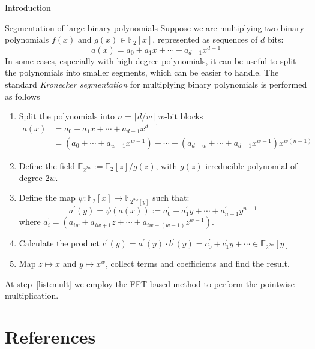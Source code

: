 \documentclass[a4paper,10pt]{article}
\begin{document}
\begin{section}{Introduction}
\begin{subsection}{Segmentation of large binary polynomials}
    Suppose we are multiplying two binary polynomials $f(x)$ and $g(x) \in \mathds{F}_2[x]$, represented as sequences of $d$ bits:
    \begin{equation*}
        a(x) = a_0 + a_1x + \cdots + a_{d-1}x^{d-1}
    \end{equation*}
    In some cases, especially with high degree polynomials, it can be useful to split the polynomials into smaller segments, which can be easier to handle. 
    The standard \textit{Kronecker segmentation} for multiplying binary polynomials is performed as follows
    \begin{enumerate}
        \item Split the polynomials into $n = \lceil d/w \rceil$ $w$-bit blocks
        \begin{align*}
            a(x) &= a_0 + a_1x + \cdots + a_{d-1}x^{d-1} \\
            &= (a_0 + \cdots + a_{w-1}x^{w-1}) + \cdots + (a_{d-w} + \cdots + a_{d-1}x^{w-1})x^{w(n-1)}
        \end{align*}

        \item Define the field $\mathds{F}_{2^{2w}}:=\mathds{F}_2[z]/g(z)$, with $g(z)$ irreducible polynomial of degree $2w$.
        \item Define the map $\psi: \mathds{F}_2[x] \rightarrow \mathds{F}_{2^{2w}[y]}$ such that:
        \begin{equation*}
            a^{\prime}(y) = \psi(a(x)) := a_0^{\prime} + a^{\prime}_1y + \cdots + a^{\prime}_{n-1}y^{n-1}
        \end{equation*}
        where $a^{\prime}_i = (a_{iw} + a_{iw + 1}z + \cdots + a_{iw+(w-1)}z^{w-1})$.
    
        \item Calculate the product $c^{\prime}(y) = a^{\prime}(y)\cdot b^{\prime}(y) = c_0^{\prime} + c^{\prime}_1y + \cdots \in \mathds{F}_{2^{2w}}[y]$ \label{list:mult}
        \item Map $z \mapsto x$ and $y \mapsto x^w$, collect terms and coefficients and find the result.
    \end{enumerate}
    At step~\eqref{list:mult} we employ the FFT-based method to perform the pointwise multiplication.
\end{subsection}
\end{section}


\section*{References}

\end{document}
